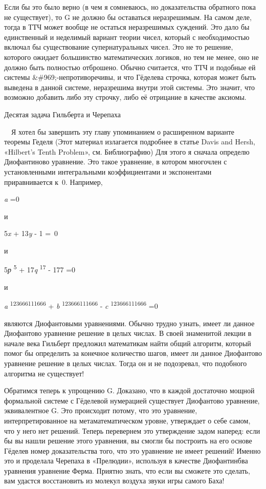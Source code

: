 \documentclass[../main.tex]{subfiles}
\begin{document}
Если бы это было верно (в чем я сомневаюсь, но доказательства обратного пока не существует), то G не должно бы оставаться неразрешимым. На самом деле, тогда в ТТЧ может вообще не остаться неразрешимых суждений. Это дало бы единственный и неделимый вариант теории чисел, который с необходимостью включал бы существование супернатуральных чисел. Это не то решение, которого ожидает большинство математических логиков, но тем не менее, оно не должно быть полностью отброшено. Обычно считается, что ТТЧ и подобные ей системы \&\#969;-непротиворечивы, и что Гёделева строчка, которая может быть выведена в данной системе, неразрешима внутри этой системы. Это значит, что возможно добавить либо эту строчку, либо её отрицание в качестве аксиомы.

Десятая задача Гильберта и Черепаха

~~Я хотел бы завершить эту главу упоминанием о расширенном варианте теоремы Геделя (Этот материал излагается подробнее в статье Davis and Hersh, «Hilbert's Tenth Problem», см. Библиографию) Для этого я сначала определю Диофантиново уравнение. Это такое уравнение, в котором многочлен с установленными интегральными коэффициентами и экспонентами приравнивается к~0. Например,

\emph{a} =0

и

5\emph{x} + 13\emph{y} - 1 =~0

и

5\emph{р} \textsuperscript{5} + 17\emph{q} \textsuperscript{17} - 177 =0

и

\emph{a} \textsuperscript{123666111666} + \emph{b} \textsuperscript{123666111666} - \emph{c} \textsuperscript{123666111666} =0

являются Диофантовыми уравнениями. Обычно трудно узнать, имеет ли данное Диофантово уравнение решение в целых числах. В своей знаменитой лекции в начале века Гильберт предложил математикам найти общий алгоритм, который помог бы определить за конечное количество шагов, имеет ли данное Диофантово уравнение решение в целых числах. Тогда он и не подозревал, что подобного алгоритма не существует!

Обратимся теперь к упрощению G. Доказано, что в каждой достаточно мощной формальной системе с Гёделевой нумерацией существует Диофантово уравнение, эквивалентное G. Это происходит потому, что это уравнение, интерпретированное на метаматематическом уровне, утверждает о себе самом, что у него нет решений. Теперь перевернем это утверждение задом наперед: если бы вы нашли решение этого уравнения, вы смогли бы построить на его основе Гёделев номер доказательства того, что это уравнение не имеет решений! Именно это и проделала Черепаха в «Прелюдии», используя в качестве Диофантинбва уравнения уравнение Ферма. Приятно знать, что если вы сможете это сделать, вам удастся восстановить из молекул воздуха звуки игры самого Баха!
\end{document}

